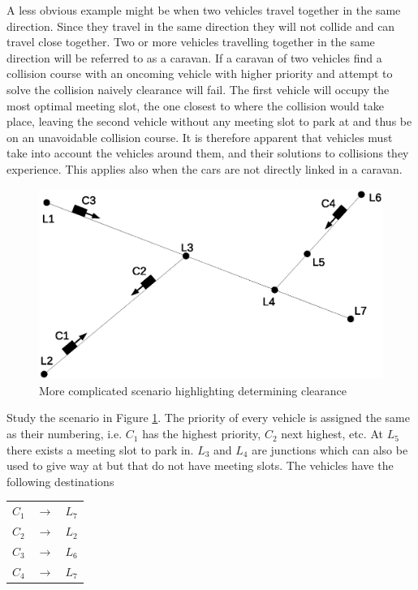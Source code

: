 \documentclass{article}
\begin{document}
			A less obvious example might be when two vehicles travel together in the same direction. Since they travel in the same direction they will not collide and can travel close together. Two or more vehicles travelling together in the same direction will be referred to as a caravan. If a caravan of two vehicles find a collision course with an oncoming vehicle with higher priority and attempt to solve the collision naively clearance will fail. The first vehicle will occupy the most optimal meeting slot, the one closest to where the collision would take place, leaving the second vehicle without any meeting slot to park at and thus be on an unavoidable collision course. It is therefore apparent that vehicles must take into account the vehicles around them, and their solutions to collisions they experience. This applies also when the cars are not directly linked in a caravan.

			\begin{figure}[H]
				\includegraphics[scale=0.5]{advancedClearanceHori.eps}
				\caption{More complicated scenario highlighting determining clearance}
				\label{fig:advancedClearance}
			\end{figure}

			Study the scenario in Figure \ref{fig:advancedClearance}. The priority of every vehicle is assigned the same as their numbering, i.e. $C_1$ has the highest priority, $C_2$ next highest, etc. At $L_5$ there exists a meeting slot to park in. $L_3$ and $L_4$ are junctions which can also be used to give way at but that do not have meeting slots. The vehicles have the following destinations

			\begin{tabular}{l l l}
				$C_1$ & $\rightarrow$ & $L_7$ \\
				$C_2$ & $\rightarrow$ & $L_2$ \\
				$C_3$ & $\rightarrow$ & $L_6$ \\
				$C_4$ & $\rightarrow$ & $L_7$ \\
			\end{tabular}
\end{document}
